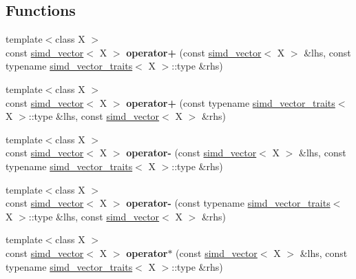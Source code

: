 \subsection*{Functions}
\begin{DoxyCompactItemize}
\item 
\hypertarget{namespacesimd_a12fd58a32316f021f723a99ab6c364be}{{\footnotesize template$<$class X $>$ }\\const \hyperlink{classsimd_1_1simd__vector}{simd\+\_\+vector}$<$ X $>$ {\bfseries operator+} (const \hyperlink{classsimd_1_1simd__vector}{simd\+\_\+vector}$<$ X $>$ \&lhs, const typename \hyperlink{structsimd_1_1simd__vector__traits}{simd\+\_\+vector\+\_\+traits}$<$ X $>$\+::type \&rhs)}\label{namespacesimd_a12fd58a32316f021f723a99ab6c364be}

\item 
\hypertarget{namespacesimd_a7891797c52ffc326c6df3ddc712f4137}{{\footnotesize template$<$class X $>$ }\\const \hyperlink{classsimd_1_1simd__vector}{simd\+\_\+vector}$<$ X $>$ {\bfseries operator+} (const typename \hyperlink{structsimd_1_1simd__vector__traits}{simd\+\_\+vector\+\_\+traits}$<$ X $>$\+::type \&lhs, const \hyperlink{classsimd_1_1simd__vector}{simd\+\_\+vector}$<$ X $>$ \&rhs)}\label{namespacesimd_a7891797c52ffc326c6df3ddc712f4137}

\item 
\hypertarget{namespacesimd_af2b6baec4f03043af75c85dfe57b939e}{{\footnotesize template$<$class X $>$ }\\const \hyperlink{classsimd_1_1simd__vector}{simd\+\_\+vector}$<$ X $>$ {\bfseries operator-\/} (const \hyperlink{classsimd_1_1simd__vector}{simd\+\_\+vector}$<$ X $>$ \&lhs, const typename \hyperlink{structsimd_1_1simd__vector__traits}{simd\+\_\+vector\+\_\+traits}$<$ X $>$\+::type \&rhs)}\label{namespacesimd_af2b6baec4f03043af75c85dfe57b939e}

\item 
\hypertarget{namespacesimd_a344e69a5e8d1b36ae07370bbbae1e1ba}{{\footnotesize template$<$class X $>$ }\\const \hyperlink{classsimd_1_1simd__vector}{simd\+\_\+vector}$<$ X $>$ {\bfseries operator-\/} (const typename \hyperlink{structsimd_1_1simd__vector__traits}{simd\+\_\+vector\+\_\+traits}$<$ X $>$\+::type \&lhs, const \hyperlink{classsimd_1_1simd__vector}{simd\+\_\+vector}$<$ X $>$ \&rhs)}\label{namespacesimd_a344e69a5e8d1b36ae07370bbbae1e1ba}

\item 
\hypertarget{namespacesimd_acab43a7a9ed46bce524333b81dd28a71}{{\footnotesize template$<$class X $>$ }\\const \hyperlink{classsimd_1_1simd__vector}{simd\+\_\+vector}$<$ X $>$ {\bfseries operator$\ast$} (const \hyperlink{classsimd_1_1simd__vector}{simd\+\_\+vector}$<$ X $>$ \&lhs, const typename \hyperlink{structsimd_1_1simd__vector__traits}{simd\+\_\+vector\+\_\+traits}$<$ X $>$\+::type \&rhs)}\label{namespacesimd_acab43a7a9ed46bce524333b81dd28a71}


\end{DoxyCompactItemize}
